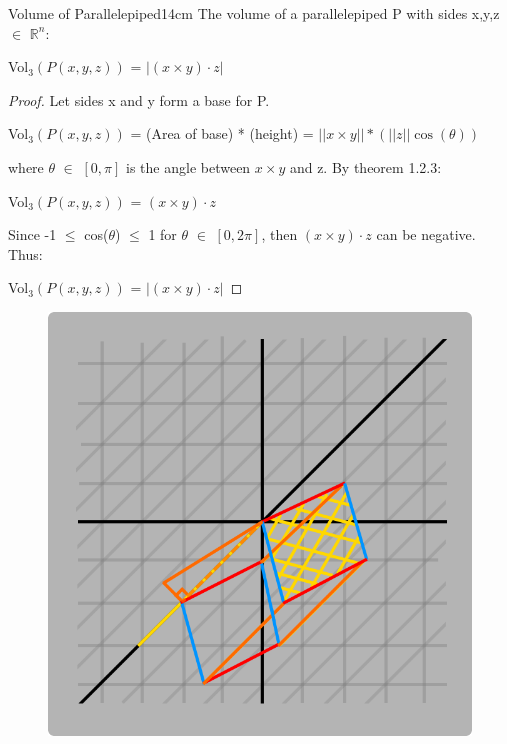     \begin{wtheorem}{Volume of Parallelepiped}{14cm}
        The volume of a parallelepiped P with sides x,y,z $\in$ $\mathbb{R}^n$:

        \hspace{0.5cm}
        Vol$_3(P(x,y,z))$
        = $|(x \times y) \cdot z|$
    \end{wtheorem}

    \begin{proof}
        Let sides x and y form a base for P.

        \hspace{0.5cm}
        Vol$_3(P(x,y,z))$
        = (Area of base) * (height)
        = $||x \times y|| * (||z|| \cos(\theta))$

        where $\theta$ $\in$ $[0,\pi]$ is the angle between $x \times y$
        and z. By {\color{red} theorem 1.2.3}:

        \hspace{0.5cm}
        Vol$_3(P(x,y,z))$ = $(x \times y) \cdot z$

        Since -1 $\leq$ cos($\theta$) $\leq$ 1 for $\theta$ $\in$ $[0,2\pi]$, then
        $(x \times y) \cdot z$ can be negative. Thus:

        \hspace{0.5cm}
        Vol$_3(P(x,y,z))$ = $|(x \times y) \cdot z|$
    \end{proof}

    \begin{figure}[h]
        \centering
        \includegraphics[scale=0.3]{Images/1.3.6.png}
    \end{figure}

